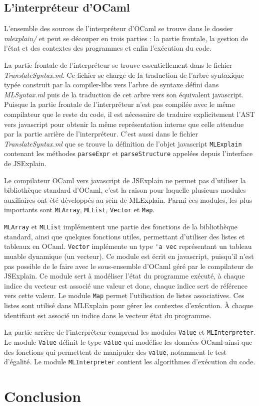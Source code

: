 \documentclass[a4paper,10pt]{report}
\begin{document}
\section{L'interpréteur d'OCaml}
L'ensemble des sources de l'interpréteur d'OCaml se trouve dans le dossier 
\emph{mlexplain/} et peut se découper en trois parties : la partie 
frontale, la gestion de l'état et des contextes des programmes et enfin 
l'exécution du code.

La partie frontale de l'interpréteur se trouve essentiellement dans le fichier 
\emph{TranslateSyntax.ml}. Ce fichier se charge de la traduction de 
l'arbre syntaxique typée construit par la compiler-libs vers l'arbre de syntaxe 
défini dans \emph{MLSyntax.ml} puis de la traduction de cet arbre vers son 
équivalent javascript. Puisque la partie frontale de l'interpréteur n'est pas 
compilée avec le même compilateur que le reste du code, il est nécessaire de 
traduire explicitement l'AST vers javascript pour obtenir la même 
représentation interne que celle attendue par la partie arrière de 
l'interpréteur. C'est aussi dans le fichier \emph{TranslateSyntax.ml} que se 
trouve la définition de l'objet javascript \verb|MLExplain| contenant les 
méthodes \verb|parseExpr| et \verb|parseStructure| appelées depuis l'interface 
de JSExplain.

Le compilateur OCaml vers javascript de JSExplain ne permet pas d'utiliser la 
bibliothèque standard d'OCaml, c'est la raison pour laquelle plusieurs modules 
auxiliaires ont été développés au sein de MLExplain. Parmi ces modules, les 
plus importants sont \verb|MLArray|, \verb|MLList|, \verb|Vector| et 
\verb|Map|.

\verb|MLArray| et \verb|MLList| implémentent une partie des fonctions de la 
bibliothèque standard, ainsi que quelques fonctions utiles, permettant 
d'utiliser des listes et tableaux en OCaml. \verb|Vector| implémente un type 
\verb|'a vec| représentant un tableau muable dynamique (un vecteur). Ce module 
est écrit en javascript, puisqu'il n'est pas possible de le faire avec le 
sous-ensemble d'OCaml géré par le compilateur de JSExplain. Ce module sert à 
modéliser l'état du programme exécuté, à chaque indice du vecteur est associé 
une valeur et donc, chaque indice sert de référence vers cette valeur. Le 
module \verb|Map| permet l'utilisation de listes associatives. Ces listes sont 
utilisé dans MLExplain pour gérer les contextes d'exécution. À chaque 
identifiant est associé un indice dans le vecteur état du programme.

La partie arrière de l'interpréteur comprend les modules \verb|Value| et 
\verb|MLInterpreter|. Le module \verb|Value| définit le type \verb|value| qui 
modélise les données OCaml ainsi que des fonctions qui permettent de manipuler 
des \verb|value|, notamment le test d'égalité. Le module \verb|MLInterpreter| 
contient les algorithmes d'exécution du code.

\chapter*{Conclusion}
\end{document}
